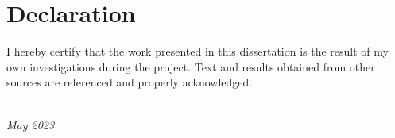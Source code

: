 \chapter*{Declaration}

I hereby certify that the work presented in this dissertation is the result of my own investigations during the \degree{} project.
Text and results obtained from other sources are referenced and properly acknowledged.

\begin{flushright}
\it \name\\
May 2023
\end{flushright}

